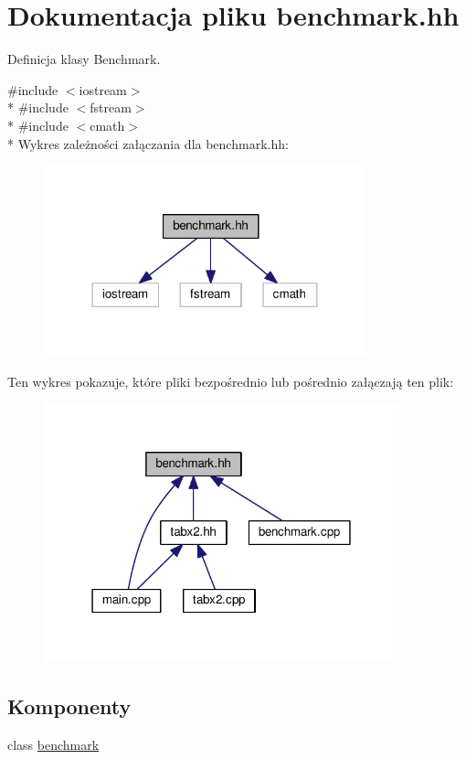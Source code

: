 \hypertarget{benchmark_8hh}{\section{Dokumentacja pliku benchmark.\-hh}
\label{benchmark_8hh}
}


Definicja klasy Benchmark.  


{\ttfamily \#include $<$iostream$>$}\\*
{\ttfamily \#include $<$fstream$>$}\\*
{\ttfamily \#include $<$cmath$>$}\\*
Wykres zależności załączania dla benchmark.\-hh\-:\nopagebreak
\begin{figure}[H]
\begin{center}
\leavevmode
\includegraphics[width=264pt]{benchmark_8hh__incl}
\end{center}
\end{figure}
Ten wykres pokazuje, które pliki bezpośrednio lub pośrednio załączają ten plik\-:\nopagebreak
\begin{figure}[H]
\begin{center}
\leavevmode
\includegraphics[width=291pt]{benchmark_8hh__dep__incl}
\end{center}
\end{figure}
\subsection*{Komponenty}
\begin{DoxyCompactItemize}
\item 
class \hyperlink{classbenchmark}{benchmark}
\end{DoxyCompactItemize}
